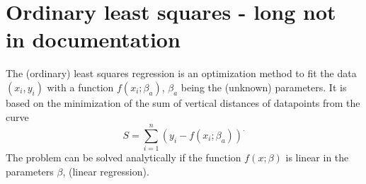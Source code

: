 %
%

\section{Ordinary least squares - long not in documentation} \label{ls}
The (ordinary) least squares regression is an optimization method to fit the data $(x_i, y_i)$ with a function $f(x_i;\beta_a)$, $\beta_a$ being the (unknown) parameters.
It is based on the minimization of the sum of vertical distances of datapoints from the curve 
\begin{equation*}
 S = \sum_{i=1}^n (y_i - f(x_i; \beta_a))^.
\end{equation*} 
The problem can be solved analytically if the function $f(x;\beta)$ is linear in the parameters $\beta$, (linear regression).

